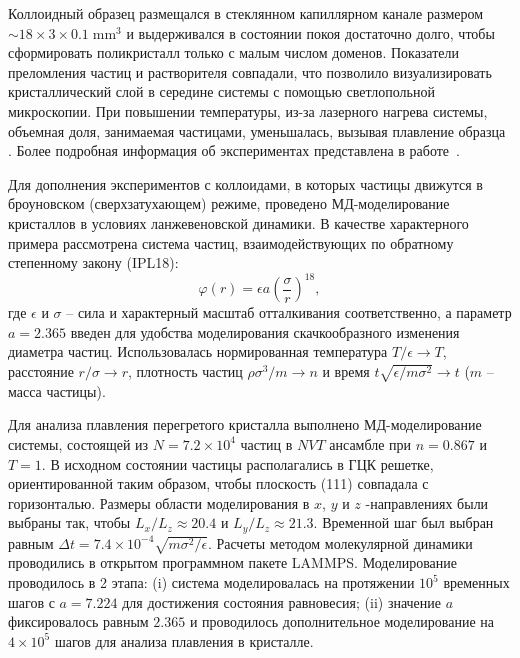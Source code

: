 Коллоидный образец размещался в стеклянном капиллярном канале размером $\sim 18 \times 3 \times 0.1 \; \mathrm{mm ^ 3} $ и выдерживался в состоянии покоя достаточно долго, чтобы сформировать поликристалл только с малым числом доменов.
Показатели преломления частиц и растворителя совпадали, что позволило визуализировать кристаллический слой в середине системы с помощью светлопольной микроскопии.
При повышении температуры, из-за лазерного нагрева системы, объемная доля, занимаемая частицами, уменьшалась, вызывая плавление образца \cite{10.1126/science.1112399}.
Более подробная информация об экспериментах представлена в работе~\cite{10.1126/science.1224763}.


Для дополнения экспериментов с коллоидами, в которых частицы движутся в броуновском (сверхзатухающем) режиме, проведено МД-моделирование кристаллов в условиях ланжевеновской динамики.
В качестве характерного примера рассмотрена система частиц, взаимодействующих по обратному степенному закону (IPL18):
\begin{equation}
\label{SSMF-eq3}
\varphi(r) = \epsilon a \left(\frac{\sigma}{r}\right)^{18},
\end{equation}
где $\epsilon$ и $\sigma$ -- сила и характерный масштаб отталкивания соответственно,
а параметр $ a = 2.365 $ введен для удобства моделирования скачкообразного изменения диаметра частиц.
Использовалась нормированная температура $ T/ \epsilon \rightarrow T $, расстояние $ r/ \sigma \rightarrow r $, плотность частиц $\rho\sigma^3/m\rightarrow n$ и время $t\sqrt{\epsilon/m\sigma^2} \rightarrow t$ ($m$ -- масса частицы).

Для анализа плавления перегретого кристалла выполнено МД-моделирование системы, состоящей из $ N = 7.2 \times 10 ^ 4 $ частиц в $NVT$ ансамбле при $n=0.867$ и $T=1$.
В исходном состоянии частицы располагались в ГЦК решетке, ориентированной таким образом, чтобы плоскость (111) совпадала с горизонталью.
Размеры области моделирования в $ x $, $ y $ и $ z $ -направлениях были выбраны так, чтобы $ L_x / L_z \approx 20.4 $ и $ L_y / L_z \approx 21.3 $.
Временной шаг был выбран равным $ \Delta t = 7.4 \times 10 ^ {- 4} \sqrt {m \sigma ^ 2 / \epsilon} $. Расчеты методом молекулярной динамики проводились в открытом программном пакете LAMMPS.
Моделирование проводилось в 2 этапа: (i) система моделировалась на протяжении $ 10 ^ 5 $ временных шагов с $ a = 7.224 $ для достижения состояния равновесия; (ii) значение $a$ фиксировалось равным $ 2.365 $ и проводилось дополнительное моделирование на $ 4 \times 10 ^ 5 $ шагов для анализа плавления в кристалле.

